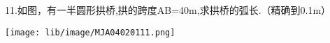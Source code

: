 11.如图，有一半圆形拱桥,拱的跨度AB=40m,求拱桥的弧长.（精确到0.1m）

\begin{flushright}

    \texttt{[image: lib/image/MJA04020111.png]}

\end{flushright}



